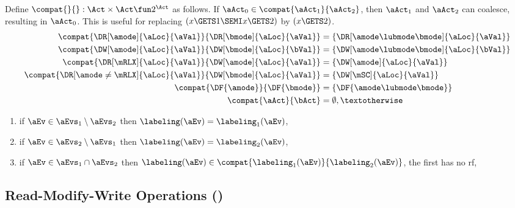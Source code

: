 \begin{definition}
  \label{def:compat}
  Define $\compat{}{}:\Act\times\Act\fun2^{\Act}$ as follows.  If
  $\aAct_0\in\compat{\aAct_1}{\aAct_2}$, then $\aAct_1$ and $\aAct_2$ can
  coalesce, resulting in $\aAct_0$.  This is useful for replacing
  $(x\GETS1\SEMI x\GETS2)$ by $(x\GETS2)$.
  \begin{align*}
    \compat{\DR[\amode]{\aLoc}{\aVal}}{\DR[\bmode]{\aLoc}{\aVal}}
    &= \{ \DR[\amode\lubmode\bmode]{\aLoc}{\aVal} \}
    \\
    \compat{\DW[\amode]{\aLoc}{\aVal}}{\DW[\bmode]{\aLoc}{\bVal}}
    &= \{ \DW[\amode\lubmode\bmode]{\aLoc}{\bVal} \}
    \\
    \compat{\DR[\mRLX]{\aLoc}{\aVal}}{\DW[\amode]{\aLoc}{\aVal}}
    &= \{ \DW[\amode]{\aLoc}{\aVal} \}
    \\
    \compat{\DR[\amode\neq\mRLX]{\aLoc}{\aVal}}{\DW[\bmode]{\aLoc}{\aVal}}
    &= \{ \DW[\mSC]{\aLoc}{\aVal} \}
    \\
    \compat{\DF{\amode}}{\DF{\bmode}} &= \{ \DF{\amode\lubmode\bmode} \}
    \\
    \compat{\aAct}{\bAct} &= \emptyset, \textotherwise
  \end{align*}
\end{definition}  

\begin{enumerate}
\item \label{seq-lambda1}
  if $\aEv\in\aEvs_1\setminus\aEvs_2$ then $\labeling(\aEv)=\labeling_1(\aEv)$,
\item \label{seq-lambda2}
  if $\aEv\in\aEvs_2\setminus\aEvs_1$ then $\labeling(\aEv)=\labeling_2(\aEv)$,
\item \label{seq-lambda12}
  if $\aEv\in\aEvs_1\cap\aEvs_2$ then $\labeling(\aEv)\in
  \compat{\labeling_1(\aEv)}{\labeling_2(\aEv)}$, the first has no rf,
\end{enumerate}
  
\subsection{Read-Modify-Write Operations (\xRMW)}

